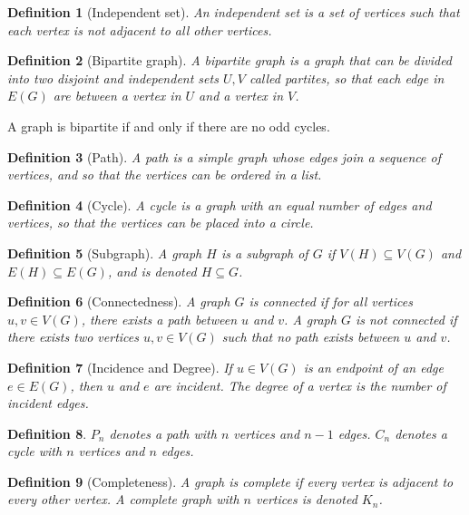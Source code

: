 \documentclass{article}
\newtheorem{defn}{Definition}[section]
\begin{document}
\begin{defn}[Independent set]
	An independent set is a set of vertices such that each vertex is not adjacent to all other vertices.
\end{defn}

\begin{defn}[Bipartite graph]
	A bipartite graph is a graph that can be divided into two disjoint and independent sets $U,V$ called partites, so that each edge in $E(G)$ are between a vertex in $U$ and a vertex in $V$.
\end{defn}
A graph is bipartite if and only if there are no odd cycles.

\begin{defn}[Path]
	A path is a simple graph whose edges join a sequence of vertices, and so that the vertices can be ordered in a list.
\end{defn}

\begin{defn}[Cycle]
	A cycle is a graph with an equal number of edges and vertices, so that the vertices can be placed into a circle.
\end{defn}

\begin{defn}[Subgraph]
	A graph $H$ is a subgraph of $G$ if $V(H)\subseteq V(G)$ and $E(H)\subseteq E(G)$, and is denoted $H\subseteq G$.
\end{defn}

\begin{defn}[Connectedness]
	A graph $G$ is connected if for all vertices $u,v\in V(G)$, there exists a path between $u$ and $v$. A graph $G$ is not connected if there exists two vertices $u,v\in V(G)$ such that no path exists between $u$ and $v$.
\end{defn}

\begin{defn}[Incidence and Degree]
	If $u\in V(G)$ is an endpoint of an edge $e\in E(G)$, then $u$ and $e$ are incident. The degree of a vertex is the number of incident edges.
\end{defn}

\begin{defn}
	$P_n$ denotes a path with $n$ vertices and $n-1$ edges. $C_n$ denotes a cycle with $n$ vertices and $n$ edges.
\end{defn}

\begin{defn}[Completeness]
	A graph is complete if every vertex is adjacent to every other vertex. A complete graph with $n$ vertices is denoted $K_n$.
\end{defn}
\end{document}
